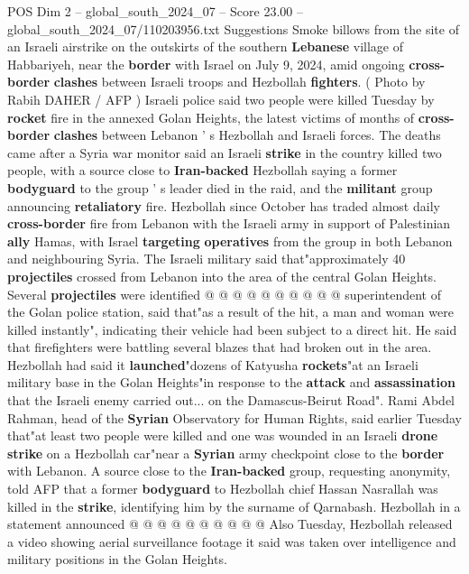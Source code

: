 \begin{textsample}{POS Dim 2 – global\_south\_2024\_07 – Score 23.00 – global\_south\_2024\_07/110203956.txt}  \label{ex:f2_pos_070}
Suggestions Smoke billows from the site of an Israeli airstrike on the outskirts of the southern \textbf{Lebanese} village of Habbariyeh, near the \textbf{border} with Israel on July 9, 2024, amid ongoing \textbf{cross-border} \textbf{clashes} between Israeli troops and Hezbollah \textbf{fighters}. ( Photo by Rabih DAHER / AFP ) Israeli police said two people were killed Tuesday by \textbf{rocket} fire in the annexed Golan Heights, the latest victims of months of \textbf{cross-border} \textbf{clashes} between Lebanon ' s Hezbollah and Israeli forces.
The deaths came after a Syria war monitor said an Israeli \textbf{strike} in the country killed two people, with a source close to \textbf{Iran-backed} Hezbollah saying a former \textbf{bodyguard} to the group ' s leader died in the raid, and the \textbf{militant} group announcing \textbf{retaliatory} fire.
Hezbollah since October has traded almost daily \textbf{cross-border} fire from Lebanon with the Israeli army in support of Palestinian \textbf{ally} Hamas, with Israel \textbf{targeting} \textbf{operatives} from the group in both Lebanon and neighbouring Syria.
The Israeli military said that"approximately 40 \textbf{projectiles} crossed from Lebanon into the area of the central Golan Heights.
Several \textbf{projectiles} were identified @ @ @ @ @ @ @ @ @ @ superintendent of the Golan police station, said that"as a result of the hit, a man and woman were killed instantly", indicating their vehicle had been subject to a direct hit.
He said that firefighters were battling several blazes that had broken out in the area.
Hezbollah had said it \textbf{launched}"dozens of Katyusha \textbf{rockets}"at an Israeli military base in the Golan Heights"in response to the \textbf{attack} and \textbf{assassination} that the Israeli enemy carried out... on the Damascus-Beirut Road".
Rami Abdel Rahman, head of the \textbf{Syrian} Observatory for Human Rights, said earlier Tuesday that"at least two people were killed and one was wounded in an Israeli \textbf{drone} \textbf{strike} on a Hezbollah car"near a \textbf{Syrian} army checkpoint close to the \textbf{border} with Lebanon.
A source close to the \textbf{Iran-backed} group, requesting anonymity, told AFP that a former \textbf{bodyguard} to Hezbollah chief Hassan Nasrallah was killed in the \textbf{strike}, identifying him by the surname of Qarnabash.
Hezbollah in a statement announced @ @ @ @ @ @ @ @ @ @ Also Tuesday, Hezbollah released a video showing aerial surveillance footage it said was taken over intelligence and military positions in the Golan Heights.

\end{textsample}
